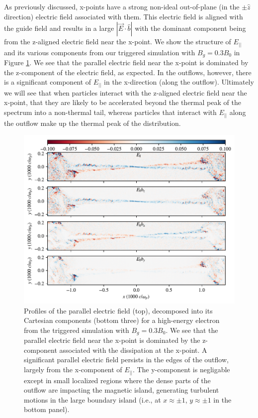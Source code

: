 \documentclass[iop,twocolappendix]{emulateapj}
\begin{document}
As previously discussed, x-points have a strong non-ideal out-of-plane (in the $\pm \hat{z}$ direction) electric field associated with them.  This electric field is aligned with the guide field and results in a large $|\vec{E}\cdot\hat{b}|$ with the dominant component being from the z-aligned electric field near the x-point.  We show the structure of $E_{||}$ and its various components from our triggered simulation with $B_{g}=0.3B_{0}$ in Figure \ref{edotb_comps}.  We see that the parallel electric field near the x-point is dominated by the z-component of the electric field, as expected.  In the outflows, however, there is a significant component of $E_{||}$ in the x-direction (along the outflow).  Ultimately we will see that when particles interact with the z-aligned electric field near the x-point, that they are likely to be accelerated beyond the thermal peak of the spectrum into a non-thermal tail, whereas particles that interact with $E_{||}$ along the outflow make up the thermal peak of the distribution.  
\begin{figure}[htp] 
	\includegraphics[width=\linewidth]{testing_singleplot_flds.pdf}
	\caption{Profiles of the parallel electric field (top), decomposed into its Cartesian components (bottom three) for a high-energy electron from the triggered simulation with $B_{g}=0.3B_{0}$.  We see that the parallel electric field near the x-point is dominated by the z-component associated with the dissipation at the x-point.  A significant parallel electric field persists in the edges of the outflow, largely from the x-component of $E_{||}$.  The y-component is negligable except in small localized regions where the dense parts of the outflow are impacting the magnetic island, generating turbulent motions in the large boundary island (i.e., at $x\approx \pm 1$, $y\approx \pm 1$ in the bottom panel). }
	\label{edotb_comps}
	\end{figure}
\end{document}
